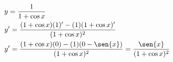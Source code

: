 \begin{ex}
\begin{align}
&y=\frac{1}{1+\cos{x}}\nonumber\\
&y'=\frac{(1+\cos{x})(1)'-(1)(1+\cos{x})'}{(1+\cos{x})^2}\nonumber\\
&y'=\frac{(1+\cos{x})(0)-(1)(0-\sen{x})}{(1+\cos{x})^2}=\frac{\sen{x}}{(1+\cos{x})^2}\nonumber
\end{align}
\end{ex}